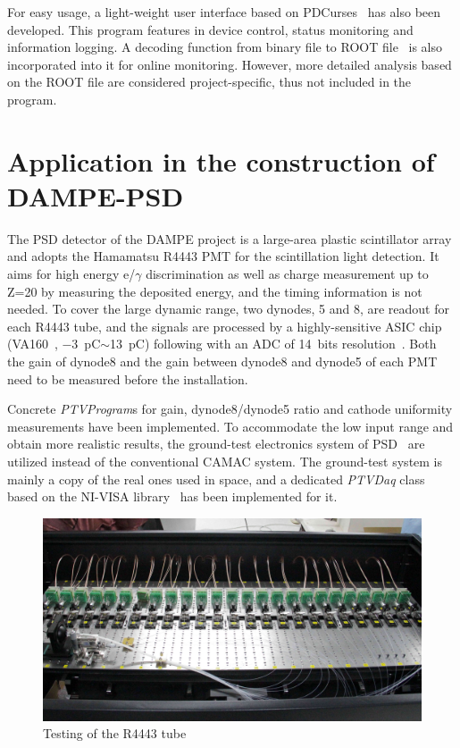 \documentclass{JINST}
\begin{document}
For easy usage, a light-weight user interface based on PDCurses~\cite{pdcurses} has also been developed.
This program features in device control, status monitoring and information logging.
A decoding function from binary file to ROOT file~\cite{root} is also incorporated into it for online monitoring.
However, more detailed analysis based on the ROOT file are considered project-specific, thus not included in the program. 

\section{Application in the construction of DAMPE-PSD}
\label{sec:application}

The PSD detector of the DAMPE project is a large-area plastic scintillator array and adopts the Hamamatsu R4443 PMT for the scintillation light detection.
It aims for high energy e/$\gamma$ discrimination as well as charge measurement up to Z=20 by measuring the deposited energy, and the timing information is not needed.
To cover the large dynamic range, two dynodes, 5 and 8, are readout for each R4443 tube, 
and the signals are processed by a highly-sensitive ASIC chip (VA160~\cite{va160}, \SI{-3}{\pico\coulomb}$\sim$\SI{13}{\pico\coulomb}) following with an ADC of 14~bits resolution~\cite{fee}. 
Both the gain of dynode8 and the gain between dynode8 and dynode5 of each PMT need to be  measured before the installation.
	
Concrete \textit{PTVProgram}s for gain, dynode8/dynode5 ratio and cathode uniformity measurements have been implemented.
To accommodate the low input range and obtain more realistic results, the ground-test electronics system of PSD~\cite{fee} are utilized instead of the conventional CAMAC system. 
The ground-test system is mainly a copy of the real ones used in space, and a dedicated \textit{PTVDaq} class based on the NI-VISA library~\cite{ni_visa} has been implemented for it.

\begin{figure}[tbp]
	\centering
	\includegraphics[width=130mm]{integration1_crop.jpg}
	\caption{Testing of the R4443 tube}
	\label{fig:Integration}
\end{figure}
\end{document}
